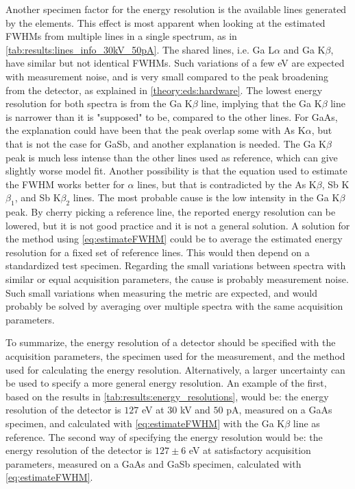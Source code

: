 Another specimen factor for the energy resolution is the available lines generated by the elements.
This effect is most apparent when looking at the estimated FWHMs from multiple lines in a single spectrum, as in \cref{tab:results:lines_info_30kV_50pA}.
The shared lines, i.e. Ga L$\alpha$ and Ga K$\beta$, have similar but not identical FWHMs.
Such variations of a few eV are expected with measurement noise, and is very small compared to the peak broadening from the detector, as explained in \cref{theory:eds:hardware}.
The lowest energy resolution for both spectra is from the Ga K$\beta$ line, implying that the Ga K$\beta$ line is narrower than it is "supposed" to be, compared to the other lines.
For GaAs, the explanation could have been that the peak overlap some with As K$\alpha$, but that is not the case for GaSb, and another explanation is needed.
The Ga K$\beta$ peak is much less intense than the other lines used as reference, which can give slightly worse model fit.
Another possibility is that the equation used to estimate the FWHM works better for $\alpha$ lines, but that is contradicted by the As K$\beta$, Sb K$\beta_1$, and Sb K$\beta_2$ lines.
The most probable cause is the low intensity in the Ga K$\beta$ peak.
By cherry picking a reference line, the reported energy resolution can be lowered, but it is not good practice and it is not a general solution.
A solution for the method using \cref{eq:estimateFWHM} could be to average the estimated energy resolution for a fixed set of reference lines.
This would then depend on a standardized test specimen.
Regarding the small variations between spectra with similar or equal acquisition parameters, the cause is probably measurement noise.
Such small variations when measuring the metric are expected, and would probably be solved by averaging over multiple spectra with the same acquisition parameters.


To summarize, the energy resolution of a detector should be specified with the acquisition parameters, the specimen used for the measurement, and the method used for calculating the energy resolution.
Alternatively, a larger uncertainty can be used to specify a more general energy resolution.
An example of the first, based on the results in \cref{tab:results:energy_resolutions}, would be:  the energy resolution of the detector is $127$ eV at $30$ kV and $50$ pA, measured on a GaAs specimen, and calculated with \cref{eq:estimateFWHM} with the Ga K$\beta$ line as reference.
The second way of specifying the energy resolution would be: the energy resolution of the detector is $127 \pm 6$ eV at satisfactory acquisition parameters, measured on a GaAs and GaSb specimen, calculated with \cref{eq:estimateFWHM}.



